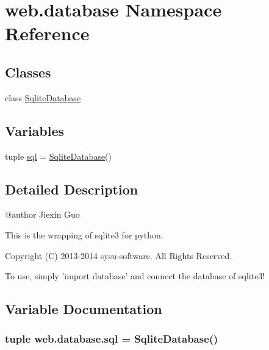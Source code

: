 \hypertarget{namespaceweb_1_1database}{\section{web.\-database Namespace Reference}
\label{namespaceweb_1_1database}
}
\subsection*{Classes}
\begin{DoxyCompactItemize}
\item 
class \hyperlink{classweb_1_1database_1_1_sqlite_database}{Sqlite\-Database}
\end{DoxyCompactItemize}
\subsection*{Variables}
\begin{DoxyCompactItemize}
\item 
tuple \hyperlink{namespaceweb_1_1database_a8ee68d73d9fa5cb7d602355fb7ce0b92}{sql} = \hyperlink{classweb_1_1database_1_1_sqlite_database}{Sqlite\-Database}()
\end{DoxyCompactItemize}


\subsection{Detailed Description}
\begin{DoxyVerb}@author Jiexin Guo

This is the wrapping of sqlite3 for python.

Copyright (C) 2013-2014 sysu-software. All Rights Reserved.

To use, simply 'import database' and connect the database of sqlite3!\end{DoxyVerb}
 

\subsection{Variable Documentation}
\hypertarget{namespaceweb_1_1database_a8ee68d73d9fa5cb7d602355fb7ce0b92}{
\subsubsection[{sql}]{\setlength{\rightskip}{0pt plus 5cm}tuple web.\-database.\-sql = {\bf Sqlite\-Database}()}}\label{namespaceweb_1_1database_a8ee68d73d9fa5cb7d602355fb7ce0b92}
